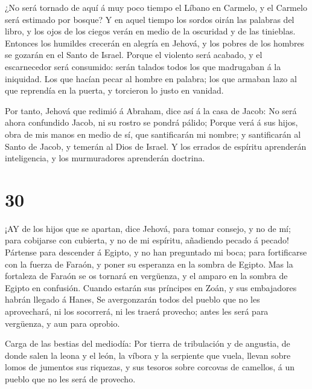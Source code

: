  ¿No será tornado de aquí á muy poco tiempo el Líbano en
Carmelo, y el Carmelo será estimado por bosque?  Y en aquel
tiempo los sordos oirán las palabras del libro, y los ojos de los ciegos
verán en medio de la oscuridad y de las tinieblas. 
Entonces los humildes crecerán en alegría en Jehová, y los pobres de los
hombres se gozarán en el Santo de Israel.  Porque el
violento será acabado, y el escarnecedor será consumido: serán talados
todos los que madrugaban á la iniquidad.  Los que hacían
pecar al hombre en palabra; los que armaban lazo al que reprendía en la
puerta, y torcieron lo justo en vanidad.

 Por tanto, Jehová que redimió á Abraham, dice así á la
casa de Jacob: No será ahora confundido Jacob, ni su rostro se pondrá
pálido;  Porque verá á sus hijos, obra de mis manos en
medio de sí, que santificarán mi nombre; y santificarán al Santo de
Jacob, y temerán al Dios de Israel.  Y los errados de
espíritu aprenderán inteligencia, y los murmuradores aprenderán
doctrina.

\hypertarget{section-29}{%
\section{30}\label{section-29}}

 ¡AY de los hijos que se apartan, dice Jehová, para tomar
consejo, y no de mí; para cobijarse con cubierta, y no de mi espíritu,
añadiendo pecado á pecado!  Pártense para descender á
Egipto, y no han preguntado mi boca; para fortificarse con la fuerza de
Faraón, y poner su esperanza en la sombra de Egipto.  Mas la
fortaleza de Faraón se os tornará en vergüenza, y el amparo en la sombra
de Egipto en confusión.  Cuando estarán sus príncipes en
Zoán, y sus embajadores habrán llegado á Hanes,  Se
avergonzarán todos del pueblo que no les aprovechará, ni los socorrerá,
ni les traerá provecho; antes les será para vergüenza, y aun para
oprobio.

 Carga de las bestias del mediodía: Por tierra de
tribulación y de angustia, de donde salen la leona y el león, la víbora
y la serpiente que vuela, llevan sobre lomos de jumentos sus riquezas, y
sus tesoros sobre corcovas de camellos, á un pueblo que no les será de
provecho.

